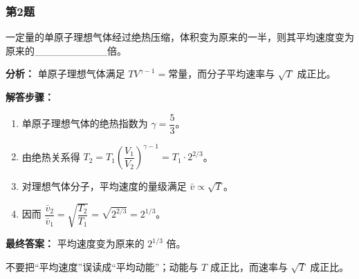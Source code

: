\documentclass[12pt,a4paper]{ctexart}
\begin{document}
\subsubsection*{第2题}
\begin{tcolorbox}[colback=gray!2!white,colframe=black!60,title={题目}]
一定量的单原子理想气体经过绝热压缩，体积变为原来的一半，则其平均速度变为原来的\_\_\_\_\_\_\_\_\_\_倍。\par
\end{tcolorbox}
\begin{tcolorbox}[colback=blue!2!white,colframe=blue!55!black,title={完整答案}]
\textbf{分析：}
单原子理想气体满足 \(TV^{\gamma-1}=\text{常量}\)，而分子平均速率与 \(\sqrt{T}\) 成正比。\par
\textbf{解答步骤：}
\begin{enumerate}
\item 单原子理想气体的绝热指数为 \(\gamma=\dfrac53\)。
\item 由绝热关系得 \(T_2=T_1\left(\dfrac{V_1}{V_2}\right)^{\gamma-1}=T_1\cdot 2^{2/3}\)。
\item 对理想气体分子，平均速度的量级满足 \(\bar v\propto \sqrt{T}\)。
\item 因而 \(\dfrac{\bar v_2}{\bar v_1}=\sqrt{\dfrac{T_2}{T_1}}=\sqrt{2^{2/3}}=2^{1/3}\)。
\end{enumerate}
\textbf{最终答案：}
平均速度变为原来的 \(2^{1/3}\) 倍。\par
\end{tcolorbox}
\begin{tcolorbox}[colback=red!2!white,colframe=red!55!black,title={易错点}]
不要把“平均速度”误读成“平均动能”；动能与 \(T\) 成正比，而速率与 \(\sqrt{T}\) 成正比。\par
\end{tcolorbox}
\end{document}
